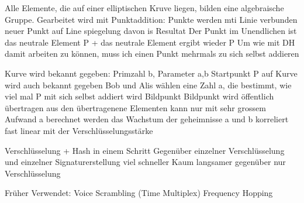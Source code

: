 \documentclass[ngerman,a4paper,12pt]{scrreprt}
\begin{document}
\ul
	\li Alle Elemente, die auf einer elliptischen Kruve liegen, bilden eine algebraische Gruppe.
	\li Gearbeitet wird mit Punktaddition:
		\ul
			\li Punkte werden mti Linie verbunden \ra neuer Punkt auf Line \ra spiegelung davon is Resultat
		\ulE
	\li Der Punkt im Unendlichen ist das neutrale Element
	\li P + das neutrale Element ergibt wieder P
	\li Um wie mit DH damit arbeiten zu können, muss ich einen Punkt mehrmals zu sich selbst addieren
\ulE
{}

\ul
	\li Kurve wird bekannt gegeben: Primzahl b, Parameter a,b
	\li Startpunkt P auf Kurve wird auch bekannt gegeben
	\li Bob und Alis wählen eine Zahl a, die bestimmt, wie viel mal P mit sich selbst addiert wird \ra Bildpunkt 
	\li Bildpunkt wird öffentlich übertragen
	\li aus den übertragenene Elementen kann nur mit sehr grossem Aufwand a berechnet werden
	\li das Wachstum der geheimnisse a und b korreliert fast linear mit der Verschlüsselungsstärke
\ulE

\ul
	\li Verschlüsselung + Hash in einem Schritt
	\li Gegenüber einzelner Verschlüsselung und einzelner Signaturerstellung viel schneller
	\li Kaum langsamer gegenüber nur Verschlüsselung
\ulE


Früher Verwendet:
\ul
	\li Voice Scrambling (Time Multiplex)
	\li Frequency Hopping
\ulE
\end{document}
